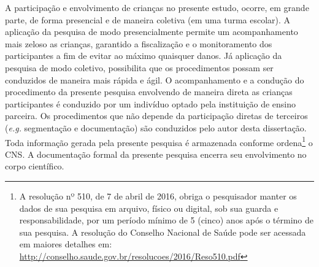A participação e envolvimento de crianças no presente estudo, ocorre, em grande parte, de forma presencial e de maneira coletiva (em uma turma escolar). A aplicação da pesquisa de modo presencialmente permite um acompanhamento mais zeloso as crianças, garantido a fiscalização e o monitoramento dos participantes a fim de evitar ao máximo quaisquer danos. Já aplicação da pesquisa de modo coletivo, possibilita que os procedimentos possam ser conduzidos de maneira mais rápida e ágil. O acompanhamento e a condução do procedimento da presente pesquisa envolvendo de maneira direta as crianças participantes é conduzido por um indivíduo optado pela instituição de ensino parceira. Os procedimentos que não depende da participação diretas de terceiros (\textit{e.g.} segmentação e documentação) são conduzidos pelo autor desta dissertação. Toda informação gerada pela presente pesquisa é armazenada conforme ordena\footnote{A resolução nº 510, de 7 de abril de 2016, obriga o pesquisador manter os dados de sua pesquisa em arquivo, físico ou digital, sob sua guarda e responsabilidade, por um período mínimo de 5 (cinco) anos após o término de sua pesquisa. A resolução do Conselho Nacional de Saúde pode ser acessada em maiores detalhes em: \url{http://conselho.saude.gov.br/resolucoes/2016/Reso510.pdf}} o \ac{CNS}. A documentação formal da presente pesquisa encerra seu envolvimento no corpo científico.






